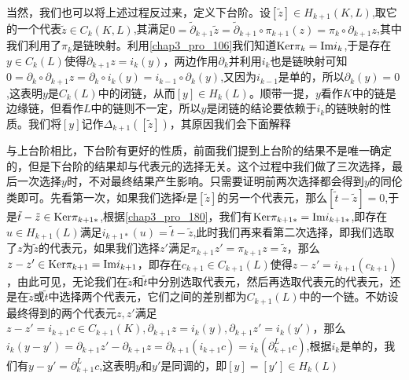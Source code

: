   当然，我们也可以将上述过程反过来，定义下台阶。设$[\tilde{z}]\in H_{k+1}(K,L)$,取它的一个代表$\tilde{z}\in C_{k}(K,L)$,其满足$0=\tilde{\partial}_{k+1}\tilde{z}=\tilde{\partial}_{k+1}\circ \pi_{k+1}(z)=\pi_{k}\circ \partial_{k+1}z$,其中我们利用了$\pi_{k}$是链映射。利用\eqref{chap3_pro_106}我们知道${\rm Ker} \pi_{k}={\rm Im} i_{k}$,于是存在$y\in C_{k}(L)$使得$\partial_{k+1}z=i_{k}(y)$，两边作用$\partial_{k}$并利用$i_{k}$也是链映射可知$0=\partial_{k}\circ\partial_{k+1}z=\partial_{k}\circ i_{k}(y)=i_{k-1}\circ\partial_{k}(y)$,又因为$i_{k-1}$是单的，所以$\partial_{k}(y)=0$,这表明$y$是$C_{k}(L)$中的闭链，从而$[y]\in H_{k}(L)$。顺带一提，$y$看作$K$中的链是边缘链，但看作$L$中的链则不一定，所以$y$是闭链的结论要依赖于$i_{k}$的链映射的性质。我们将$[y]$记作$\Delta_{k+1}([\tilde{z}])$，其原因我们会下面解释
  
  与上台阶相比，下台阶有更好的性质，前面我们提到上台阶的结果不是唯一确定的，但是下台阶的结果却与代表元的选择无关。这个过程中我们做了三次选择，最后一次选择$y$时，不对最终结果产生影响。只需要证明前两次选择都会得到$y$的同伦类即可。先看第一次，如果我们选择$\tilde{t}$是$[\tilde{z}]$的另一个代表元，那么$[\tilde{t}-\tilde{z}]=0$,于是$\tilde{t}-\tilde{z}\in {\rm Ker} \pi_{k+1*}$,根据\eqref{chap3_pro_180}，我们有${\rm Ker}\pi_{k+1*}={\rm Im} i_{k+1*}$,即存在$u\in H_{k+1}(L)$满足$i_{k+1*}(u)=\tilde{t}-\tilde{z}$,此时我们再来看第二次选择，即我们选取了$z$为$\tilde{z}$的代表元，如果我们选择$z'$满足$\pi_{k+1}z'=\pi_{k+1}z=\tilde{z}$，那么$z-z'\in {\rm Ker} \pi_{k+1}={\rm Im} i_{k+1}$，即存在$c_{k+1}\in C_{k+1}(L)$使得$z-z'=i_{k+1}(c_{k+1})$，由此可见，无论我们在$\tilde{z}$和$\tilde{t}$中分别选取代表元，然后再选取代表元的代表元，还是在$\tilde{z}$或$\tilde{t}$中选择两个代表元，它们之间的差别都为$C_{k+1}(L)$中的一个链。不妨设最终得到的两个代表元$z,z'$满足$z-z'=i_{k+1}c\in C_{k+1}(K),\partial_{k+1}z=i_{k}(y),\partial_{k+1}z'=i_{k}(y')$，那么$i_{k}(y-y')=\partial_{k+1}z'-\partial_{k+1}z=\partial_{k+1}(i_{k+1}c)=i_{k}(\partial^{L}_{k+1}c)$,根据$i_{k}$是单的，我们有$y-y'=\partial^{L}_{k+1}c$,这表明$y$和$y'$是同调的，即$[y]=[y']\in H_{k}(L)$
 
